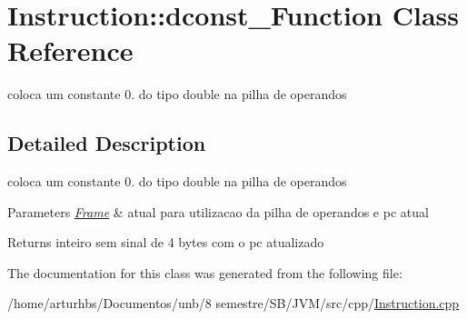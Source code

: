\hypertarget{classInstruction_1_1dconst__0Function}{}\section{Instruction\+:\+:dconst\+\_\+Function Class Reference}
\label{classInstruction_1_1dconst__0Function}


coloca um constante 0. do tipo double na pilha de operandos  




\subsection{Detailed Description}
coloca um constante 0. do tipo double na pilha de operandos 


\begin{DoxyParams}{Parameters}
{\em \hyperlink{classFrame}{Frame}} & atual para utilizacao da pilha de operandos e pc atual \\
\hline
\end{DoxyParams}
\begin{DoxyReturn}{Returns}
inteiro sem sinal de 4 bytes com o pc atualizado 
\end{DoxyReturn}


The documentation for this class was generated from the following file\+:\begin{DoxyCompactItemize}
\item 
/home/arturhbs/\+Documentos/unb/8 semestre/\+S\+B/\+J\+V\+M/src/cpp/\hyperlink{Instruction_8cpp}{Instruction.\+cpp}\end{DoxyCompactItemize}
